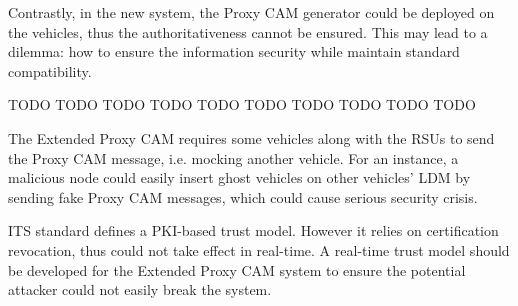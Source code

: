 Contrastly, in the new system, the Proxy CAM generator could be deployed on the vehicles, thus the authoritativeness cannot be ensured.
This may lead to a dilemma: how to ensure the information security while maintain standard compatibility.

TODO TODO TODO TODO TODO TODO TODO TODO TODO TODO

The Extended Proxy CAM requires some vehicles along with the RSUs to send the Proxy CAM message, i.e. mocking another vehicle.
For an instance, a malicious node could easily insert ghost vehicles on other vehicles' LDM by sending fake Proxy CAM messages, which could cause serious security crisis.

ITS standard \cite{???} defines a PKI-based trust model. However it relies on certification revocation, thus could not take effect in real-time.
A real-time trust model should be developed for the Extended Proxy CAM system to ensure the potential attacker could not easily break the system.

